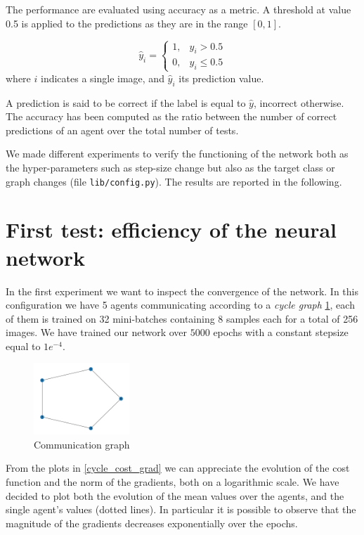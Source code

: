 \documentclass[a4paper,11pt,oneside]{book}
\begin{document}
\bigskip
The performance are evaluated using accuracy as a metric. A threshold at value 0.5 is applied to the predictions as they are in the range $[0, 1]$.

\begin{equation}
\hat{y}_i = 
\begin{cases}
1, & \hat{y}_i > 0.5 \\
0, & \hat{y}_i \le 0.5
\end{cases}
\end{equation}
where $i$ indicates a single image, and $\hat{y}_i$ its prediction value.

\bigskip
A prediction is said to be correct if the label is equal to $\hat{y}$, incorrect otherwise.
The accuracy has been computed as the ratio between the number of correct predictions of an agent over the total number of tests.

\bigskip
We made different experiments to verify the functioning of the network both as the hyper-parameters such as step-size change but also as the target class or graph changes (file \texttt{lib/config.py}). The results are reported in the following.

\newpage
\section{First test: efficiency of the neural network}
In the first experiment we want to inspect the convergence of the network. In this configuration we have 5 agents communicating according to a \textit{cycle graph} \ref{cycle_graph}, each of them is trained on 32 mini-batches containing 8 samples each for a total of 256 images. 
We have trained our network over $5000$ epochs with a constant stepsize equal to $1e^{-4}$.

\begin{figure}[h]
    \centering
    \includegraphics[width=0.32\textwidth]{cycle/graph}
    \caption{Communication graph}
    \label{cycle_graph}
\end{figure}

From the plots in \ref{cycle_cost_grad} we can appreciate the evolution of the cost function and the norm of the gradients, both on a logarithmic scale. We have decided to plot both the evolution of the mean values over the agents, and the single agent's values (dotted lines). In particular it is possible to observe that the magnitude of the gradients decreases exponentially over the epochs.
\end{document}
